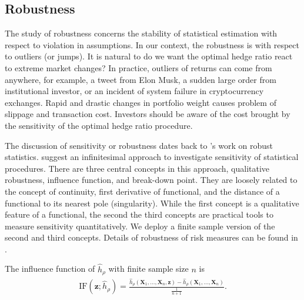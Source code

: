 \subsection{Robustness}\label{subsec:robustness}
The study of robustness concerns the stability of statistical estimation with respect to violation in assumptions.
In our context, the robustness is with respect to outliers (or jumps).
It is natural to do we want the optimal hedge ratio react to extreme market changes?
In practice, outliers of returns can come from anywhere, for example, a tweet from Elon Musk, a sudden large order from
institutional investor, or an incident of system failure in cryptocurrency exchanges.
Rapid and drastic changes in portfolio weight causes problem of slippage and transaction cost.
Investors should be aware of the cost brought by the sensitivity of the optimal hedge ratio procedure.
\medskip

The discussion of sensitivity or robustness dates back to \citet{huber1981robust}'s work on robust statistics.
\citet{hampel2011robust} suggest an infinitesimal approach to investigate sensitivity of statistical procedures.
There are three central concepts in this approach, qualitative robustness, influence function, and break-down point.
They are loosely related to the concept of continuity, first derivative of functional, and the distance of a functional to its nearest pole (singularity).
While the first concept is a qualitative feature of a functional, the second the third concepts are practical tools to measure sensitivity quantitatively.
We deploy a finite sample version of the second and third concepts.
Details of robustness of risk measures can be found in \citet{cont2010robustness}. \medskip


The influence function of $\hat h_\rho$ with finite sample size $n$ is
\begin{align}
    \text{IF}(\bm{z}; \hat h_\rho) = \frac{\hat h_\rho(\bm{X}_1,...,\bm{X}_n, \bm{z})-
    \hat h_\rho(\bm{X}_1,...,\bm{X}_n)}{\frac{1}{n+1}}.
    \end{align}

